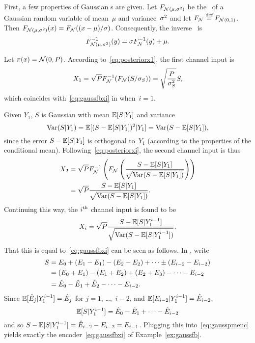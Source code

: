\begin{example}
  \label{ex:gaussfbpost}
  First, a few properties of Gaussian \cdf s are given. Let $F_{{\mathcal{N}}(\mu, {\sigma^2})}$
  be the \cdf\ of a Gaussian random variable of mean~$\mu$ and variance~${\sigma^2}$
  and let $F_{\mathcal{N}} \stackrel{\text{def}}{=} F_{{\mathcal{N}}(0,1)}$. Then $F_{{\mathcal{N}}(\mu,{\sigma^2})}(x) =
  F_{\mathcal{N}}((x-\mu)/\sigma)$. Consequently, the inverse \cdf\ is 
  \begin{equation*}
    F_{{\mathcal{N}}(\mu,{\sigma^2})}^{-1}(y) = \sigma F_{\mathcal{N}}^{-1}(y) + \mu.
  \end{equation*}

  Let $\pi(x) = {\mathcal{N}}(0,P)$. According to~\eqref{eq:posteriorx1}, the first channel
  input is
  \begin{equation*}
    X_1 = \sqrt{P} F_{{\mathcal{N}}}^{-1}(F_{{\mathcal{N}}}(S/\sigma_S)) = \sqrt{\frac{P}{{\sigma_S^2}}} S,
  \end{equation*}
  which coincides with~\eqref{eq:gaussfbxi} in  when~$i=1$.

  Given $Y_1$, $S$ is Gaussian with mean $\mathbb{E}[S|Y_1]$ and variance
  \[ \operatorname{Var}(S|Y_1) = \mathbb{E}[(S-\mathbb{E}[S|Y_1])^2 | Y_1] = \operatorname{Var}(S-\mathbb{E}[S|Y_1]), \]
  since the error $S - \mathbb{E}[S|Y_1]$ is orthogonal to~$Y_1$ (according to the
  properties of the conditional mean).  Following~\eqref{eq:posteriorxi}, the
  second channel input is thus
  \begin{align*}
    X_2 &= \sqrt P F_{{\mathcal{N}}}^{-1} \left( F_{{\mathcal{N}}} \left( \frac{S - \mathbb{E}[S|Y_1]}
    {\sqrt{\operatorname{Var}(S-\mathbb{E}[S|Y_1])}} \right) \right) \\
    &= \sqrt{P} \frac{S - \mathbb{E}[S|Y_1]}{\sqrt{\operatorname{Var}(S-\mathbb{E}[S|Y_1])}}.
  \end{align*}
  Continuing this way, the $i{^{\text{th}}}$ channel input is found to be
  \begin{equation}
    \label{eq:gausspmenc}
    X_i = \sqrt{P} \frac{S - \mathbb{E}[S|Y_1^{i-1}]}{\sqrt{\operatorname{Var}(S-\mathbb{E}[S|Y_1^{i-1}])}}.
  \end{equation}
  That this is equal to~\eqref{eq:gaussfbxi} can be seen as follows. In
  , write
  \begin{align*}
    S &= E_0 + (E_1 - E_1) - (E_2 - E_2) + \dots \pm (E_{i-2} -
    E_{i-2}) \\
    &= (E_0 + E_1) - (E_1 + E_2) + (E_2 + E_3) - \dots - E_{i-2} \\
    &= \hat{E}_0 - \hat{E}_1 + \hat{E}_2 - \dots - E_{i-2}.
  \end{align*}
  Since $\mathbb{E}[\hat{E}_j | Y_1^{i-1}] = \hat{E}_j$ for $j = 1$, \dots,~$i-2$, and
  $\mathbb{E}[E_{i-2}|Y_1^{i-1}] = \hat{E}_{i-2}$, 
  \begin{equation*}
    \mathbb{E}[S|Y_1^{i-1}] = \hat{E}_0 - \hat{E}_1 + \dots  - \hat{E}_{i-2}
  \end{equation*}
  and so $S - \mathbb{E}[S|Y_1^{i-1}] = \hat{E}_{i-2} - E_{i-2} = E_{i-1}$. Plugging this
  into~\eqref{eq:gausspmenc} yields exactly the encoder~\eqref{eq:gaussfbxi} of
  Example~\ref{ex:gaussfb}.
\end{example}

